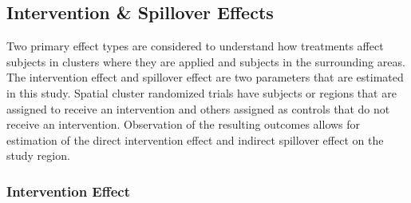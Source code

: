 \documentclass{article}[11pt]
\begin{document}
\subsection{Intervention \& Spillover Effects}

Two primary effect types are considered to understand how treatments affect subjects in clusters where they are applied and subjects in the surrounding areas. The intervention effect and spillover effect are two parameters that are estimated in this study. Spatial cluster randomized trials have subjects or regions that are assigned to receive an intervention and others assigned as controls that do not receive an intervention. Observation of the resulting outcomes allows for estimation of the direct intervention effect and indirect spillover effect on the study region.

\subsubsection{Intervention Effect}\label{Section:InterventionEffect}
\end{document}
